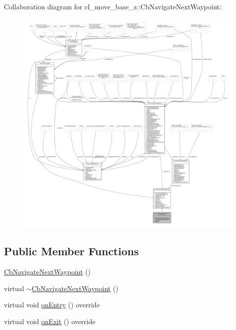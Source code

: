 Collaboration diagram for cl\+\_\+move\+\_\+base\+\_\+z\+:\+:Cb\+Navigate\+Next\+Waypoint\+:
\nopagebreak
\begin{figure}[H]
\begin{center}
\leavevmode
\includegraphics[width=350pt]{classcl__move__base__z_1_1CbNavigateNextWaypoint__coll__graph}
\end{center}
\end{figure}
\subsection*{Public Member Functions}
\begin{DoxyCompactItemize}
\item 
\hyperlink{classcl__move__base__z_1_1CbNavigateNextWaypoint_ae76bae37ab364bf6f48b8a200dd63ced}{Cb\+Navigate\+Next\+Waypoint} ()
\item 
virtual \hyperlink{classcl__move__base__z_1_1CbNavigateNextWaypoint_a35a4ab32307256f3e0a6433efb336227}{$\sim$\+Cb\+Navigate\+Next\+Waypoint} ()
\item 
virtual void \hyperlink{classcl__move__base__z_1_1CbNavigateNextWaypoint_a04913ef24344363669c1916b5df28493}{on\+Entry} () override
\item 
virtual void \hyperlink{classcl__move__base__z_1_1CbNavigateNextWaypoint_a1a848f7bfedd23fea7de59a940257b05}{on\+Exit} () override
\end{DoxyCompactItemize}


